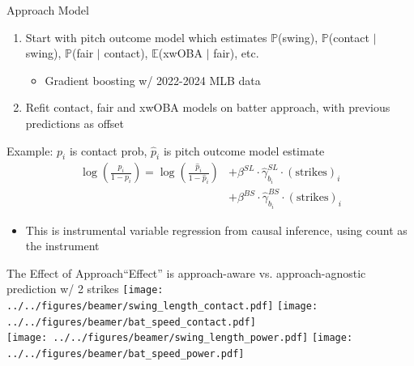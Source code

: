 \documentclass{beamer}
\begin{document}
\begin{frame}{Approach Model}
  \begin{enumerate}
    \item Start with pitch outcome model which estimates $\mathbb{P}$(swing), $\mathbb{P}$(contact $\mid$ swing), $\mathbb{P}$(fair $\mid$ contact), $\mathbb{E}$(xwOBA $\mid$ fair), etc.
    \begin{itemize}
      \item Gradient boosting w/ 2022-2024 MLB data
    \end{itemize}
    \item Refit contact, fair and xwOBA models on batter approach, with previous predictions as offset
  \end{enumerate}
  Example: $p_i$ is contact prob, $\hat p_i$ is pitch outcome model estimate
  \begin{align*}
    \log\left(\frac{p_i}{1 - p_i}\right) = \log\left(\frac{\hat p_i}{1 - \hat p_i}\right)
      &+ \beta^{SL} \cdot \hat\gamma^{SL}_{b_i} \cdot (\mbox{strikes})_i\\
      &+ \beta^{BS} \cdot \hat\gamma^{BS}_{b_i} \cdot (\mbox{strikes})_i
  \end{align*}
  \begin{itemize}
    \item This is instrumental variable regression from causal inference, using count as the instrument
  \end{itemize}
\end{frame}

\begin{frame}{The Effect of Approach}{``Effect'' is approach-aware vs. approach-agnostic prediction w/ 2 strikes}
  \centering
  \texttt{[image: ../../figures/beamer/swing\_length\_contact.pdf]}
  \texttt{[image: ../../figures/beamer/bat\_speed\_contact.pdf]}\\
  \texttt{[image: ../../figures/beamer/swing\_length\_power.pdf]}
  \texttt{[image: ../../figures/beamer/bat\_speed\_power.pdf]}
\end{frame}
\end{document}
